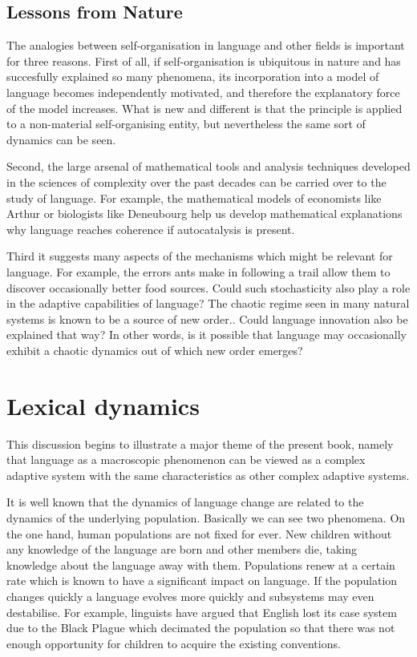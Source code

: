 \subsection{Lessons from Nature}

The analogies between self-organisation 
in language and other fields is important for three reasons. 
First of all, if self-organisation is ubiquitous in nature
and has succesfully explained so many phenomena, its incorporation
into a model of language becomes independently motivated, and
therefore the explanatory force of the model increases. 
What is new and different is that the principle is applied
to a non-material self-organising entity, but nevertheless
the same sort of dynamics can be seen. 

Second, the large arsenal of 
mathematical tools and analysis techniques
developed in the sciences of complexity over the past decades
can be carried over to the study of language. For example, 
the mathematical models of economists like 
Arthur or biologists like Deneubourg help us develop 
mathematical explanations why language reaches coherence if autocatalysis
is present.

Third it suggests many aspects of the mechanisms
which might be relevant for language. For example, the errors ants make 
in following a trail allow them to discover occasionally 
better food sources. Could such stochasticity also play a role 
in the adaptive capabilities of language? The chaotic regime
seen in many natural systems is known to be a source
of new order.\cite{Kaneko:1996}. Could language innovation 
also be explained that way? In other words, is it possible  
that language may occasionally exhibit a chaotic
dynamics out of which new order emerges?

\section{Lexical dynamics} 

This discussion begins to illustrate a major theme 
of the present book, namely that language as a 
macroscopic phenomenon can be viewed as a complex adaptive 
system with the same characteristics as other complex
adaptive systems. 

It is well known that the dynamics of language change 
are related to the dynamics of the underlying population. Basically
we can see two phenomena. On the one hand, human populations
are not fixed for ever. New children without any knowledge
of the language are born
and other members die, taking knowledge about the 
language away with them. Populations renew at a certain rate 
which is known to have a significant impact on language. 
If the population changes quickly a language
evolves more quickly and subsystems may even destabilise. 
For example, linguists have argued that English lost its 
case system due to the Black Plague which decimated the 
population so that there was not enough opportunity for 
children to acquire the existing conventions. 

